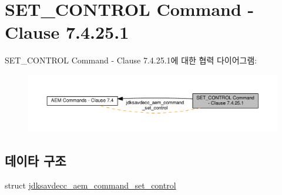 \hypertarget{group__command__set__control}{}\section{S\+E\+T\+\_\+\+C\+O\+N\+T\+R\+OL Command -\/ Clause 7.4.25.1}
\label{group__command__set__control}
S\+E\+T\+\_\+\+C\+O\+N\+T\+R\+OL Command -\/ Clause 7.4.25.1에 대한 협력 다이어그램\+:
\nopagebreak
\begin{figure}[H]
\begin{center}
\leavevmode
\includegraphics[width=350pt]{group__command__set__control}
\end{center}
\end{figure}
\subsection*{데이타 구조}
\begin{DoxyCompactItemize}
\item 
struct \hyperlink{structjdksavdecc__aem__command__set__control}{jdksavdecc\+\_\+aem\+\_\+command\+\_\+set\+\_\+control}
\end{DoxyCompactItemize}
